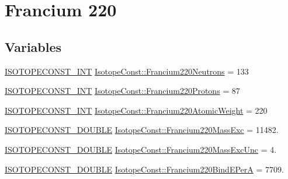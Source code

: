 \hypertarget{group___isotope_const-_francium-_fr220}{}\section{Francium 220}
\label{group___isotope_const-_francium-_fr220}
\subsection*{Variables}
\begin{DoxyCompactItemize}
\item 
\mbox{\hyperlink{group___isotope_const-_macros_ga5f18360b3e99483a35c32d789e62621c}{I\+S\+O\+T\+O\+P\+E\+C\+O\+N\+S\+T\+\_\+\+I\+NT}} \mbox{\hyperlink{group___isotope_const-_francium-_fr220_ga204748e7deacbbf6121577a3bfd1f0b7}{Isotope\+Const\+::\+Francium220\+Neutrons}} = 133
\item 
\mbox{\hyperlink{group___isotope_const-_macros_ga5f18360b3e99483a35c32d789e62621c}{I\+S\+O\+T\+O\+P\+E\+C\+O\+N\+S\+T\+\_\+\+I\+NT}} \mbox{\hyperlink{group___isotope_const-_francium-_fr220_ga71babe8ce9a5d5ef56a05eca9a4a43fa}{Isotope\+Const\+::\+Francium220\+Protons}} = 87
\item 
\mbox{\hyperlink{group___isotope_const-_macros_ga5f18360b3e99483a35c32d789e62621c}{I\+S\+O\+T\+O\+P\+E\+C\+O\+N\+S\+T\+\_\+\+I\+NT}} \mbox{\hyperlink{group___isotope_const-_francium-_fr220_gab1df60576c1418d23735743c8a5bd2fb}{Isotope\+Const\+::\+Francium220\+Atomic\+Weight}} = 220
\item 
\mbox{\hyperlink{group___isotope_const-_macros_ga8f45a7272ce02c0b4c65c44636ed719a}{I\+S\+O\+T\+O\+P\+E\+C\+O\+N\+S\+T\+\_\+\+D\+O\+U\+B\+LE}} \mbox{\hyperlink{group___isotope_const-_francium-_fr220_ga2d7234d336b1558b9ad2faf63e18cddc}{Isotope\+Const\+::\+Francium220\+Mass\+Exc}} = 11482.
\item 
\mbox{\hyperlink{group___isotope_const-_macros_ga8f45a7272ce02c0b4c65c44636ed719a}{I\+S\+O\+T\+O\+P\+E\+C\+O\+N\+S\+T\+\_\+\+D\+O\+U\+B\+LE}} \mbox{\hyperlink{group___isotope_const-_francium-_fr220_gae5644ec48f0e4f49c6fe3e6dd32caf9e}{Isotope\+Const\+::\+Francium220\+Mass\+Exc\+Unc}} = 4.
\item 
\mbox{\hyperlink{group___isotope_const-_macros_ga8f45a7272ce02c0b4c65c44636ed719a}{I\+S\+O\+T\+O\+P\+E\+C\+O\+N\+S\+T\+\_\+\+D\+O\+U\+B\+LE}} \mbox{\hyperlink{group___isotope_const-_francium-_fr220_ga52ad59aa45a0151483c4233b2349140b}{Isotope\+Const\+::\+Francium220\+Bind\+E\+PerA}} = 7709.
\item 

\end{DoxyCompactItemize}
